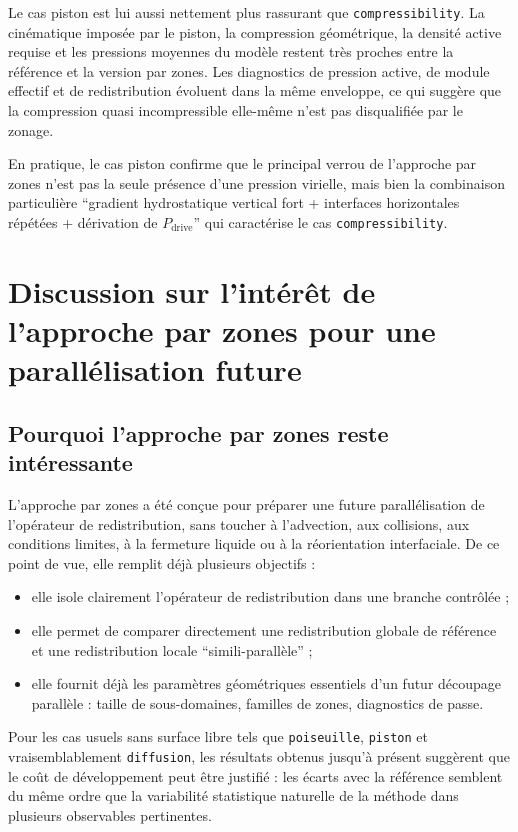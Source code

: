 \documentclass[11pt,a4paper]{article}
\begin{document}
Le cas piston est lui aussi nettement plus rassurant que \texttt{compressibility}. La cinématique imposée par le piston, la compression géométrique, la densité active requise et les pressions moyennes du modèle restent très proches entre la référence et la version par zones. Les diagnostics de pression active, de module effectif et de redistribution évoluent dans la même enveloppe, ce qui suggère que la compression quasi incompressible elle-même n'est pas disqualifiée par le zonage.

En pratique, le cas piston confirme que le principal verrou de l'approche par zones n'est pas la seule présence d'une pression virielle, mais bien la combinaison particulière ``gradient hydrostatique vertical fort + interfaces horizontales répétées + dérivation de $P_{\mathrm{drive}}$'' qui caractérise le cas \texttt{compressibility}.

\section{Discussion sur l'intérêt de l'approche par zones pour une parallélisation future}

\subsection{Pourquoi l'approche par zones reste intéressante}

L'approche par zones a été conçue pour préparer une future parallélisation de l'opérateur de redistribution, sans toucher à l'advection, aux collisions, aux conditions limites, à la fermeture liquide ou à la réorientation interfaciale. De ce point de vue, elle remplit déjà plusieurs objectifs :
\begin{itemize}
  \item elle isole clairement l'opérateur de redistribution dans une branche contrôlée ;
  \item elle permet de comparer directement une redistribution globale de référence et une redistribution locale ``simili-parallèle'' ;
  \item elle fournit déjà les paramètres géométriques essentiels d'un futur découpage parallèle : taille de sous-domaines, familles de zones, diagnostics de passe.
\end{itemize}
Pour les cas usuels sans surface libre tels que \texttt{poiseuille}, \texttt{piston} et vraisemblablement \texttt{diffusion}, les résultats obtenus jusqu'à présent suggèrent que le coût de développement peut être justifié : les écarts avec la référence semblent du même ordre que la variabilité statistique naturelle de la méthode dans plusieurs observables pertinentes.
\end{document}
